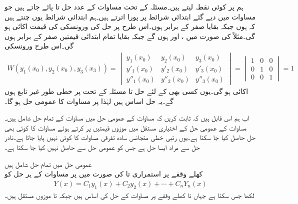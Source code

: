 ہم  پر کوئی نقطہ  لیتے ہیں۔مسئلہ  کے تحت مساوات  کے  عدد حل  تا  پائے جاتے ہیں جو مساوات  میں دیے گئے  ابتدائی شرائط پر پورا اترتے ہیں۔ہم ابتدائی شرائط یوں چنتے ہیں کہ  ہوں جبکہ بقایا  صفر کے برابر ہوں۔اس طرح  پر حل کی ورونسکی کی قیمت اکائی  ہو گی۔مثلاً  کی صورت میں  ،  اور  ہوں گے جبکہ بقایا تمام ابتدائی قیمتیں صفر کے برابر ہوں گی۔اس طرح ورونسکی
\begin{align*}
W(y_1(x_0),y_2(x_0),y_3(x_3))=
\begin{vmatrix}
y_1(x_0) & y_2(x_0) & y_3(x_0)\\
y'_1(x_0) & y'_2(x_0) & y'_3(x_0)\\
y''_1(x_0) & y''_2(x_0) & y''_3(x_0)
\end{vmatrix}
=
\begin{vmatrix}
1&0&0\\
0&1&0\\
0&0&1
\end{vmatrix}
=1
\end{align*}
اکائی ہو گی۔یوں کسی بھی  کے لئے  حل  تا  مسئلہ  کے تحت  پر خطی طور غیر تابع ہوں گے۔یہ حل اساس ہیں لہٰذا  پر مساوات  کا عمومی حل  ہو گا۔

اب ہم اس قابل ہیں کہ ثابت کریں کہ مساوات  کے عمومی حل میں مساوات  کے تمام حل شامل ہیں۔مساوات  کے عمومی حل کے اختیاری مستقل میں موزوں قیمتیں پر کرتے ہوئے مساوات   کا کوئی بھی حل حاصل کیا جا سکتا ہے۔یوں  رتبی خطی متجانس سادہ تفرقی مساوات  کا کوئی  نہیں پایا جاتا ہے۔نادر حل سے مراد ایسا حل ہے جس کو عمومی حل سے حاصل نہیں کیا جا سکتا ہے۔ 

\quad عمومی حل میں تمام حل شامل ہیں\\
کھلے وقفے  پر استمراری  تا  کی صورت میں  پر مساوات  کے ہر حل  کو
\begin{align}
Y(x)=C_1y_1(x)+C_2y_2(x)+\cdots+C_nY_n(x)
\end{align}
لکھا جس سکتا ہے جہاں  تا  کھلے وقفے  پر مساوات   کے حل کی اساس ہیں جبکہ  تا  موزوں مستقل ہیں۔

